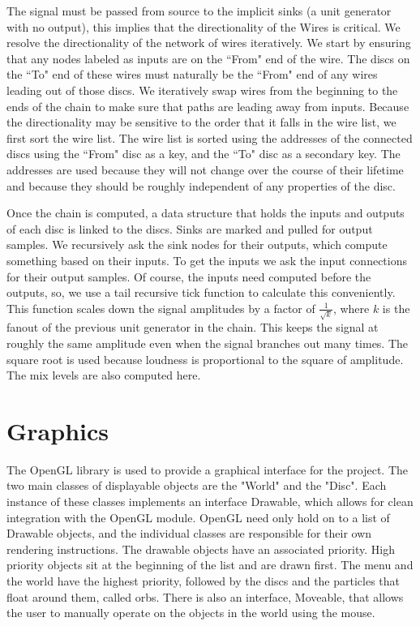 \documentclass[pdftext,twoside,10pt]{article}
\begin{document}
The signal must be passed from source to the implicit sinks (a unit generator with no output), this implies that the directionality of the Wires is critical. We resolve the directionality of the network of wires iteratively. We start by ensuring that any nodes labeled as inputs are on the ``From" end of the wire. The discs on the ``To" end of these wires must naturally be the ``From" end of any wires leading out of those discs. We iteratively swap wires from the beginning to the ends of the chain to make sure that paths are leading away from inputs. Because the directionality may be sensitive to the order that it falls in the wire list, we first sort the wire list. The wire list is sorted using the addresses of the connected discs using the ``From" disc as a key, and the ``To" disc as a secondary key. The addresses are used because they will not change over the course of their lifetime and because they should be roughly independent of any properties of the disc.

Once the chain is computed, a data structure that holds the inputs and outputs of each disc is linked to the discs. Sinks are marked and pulled for output samples. We recursively ask the sink nodes for their outputs, which compute something based on their inputs. To get the inputs we ask the input connections for their output samples. Of course, the inputs need computed before the outputs, so, we use a tail recursive tick function to calculate this conveniently. This function scales down the signal amplitudes by a factor of $\frac{1}{\sqrt{k}}$, where $k$ is the fanout of the previous unit generator in the chain. This keeps the signal at roughly the same amplitude even when the signal branches out many times. The square root is used because loudness is proportional to the square of amplitude. The mix levels are also computed here. 

\vspace{1cm}

\section{Graphics}
The OpenGL library is used to provide a graphical interface for the project. The two main classes of displayable objects are the "World" and the "Disc". Each instance of these classes implements an interface Drawable, which allows for clean integration with the OpenGL module. OpenGL need only hold on to a list of Drawable objects, and the individual classes are responsible for their own rendering instructions. The drawable objects have an associated priority. High priority objects sit at the beginning of the list and are drawn first. The menu and the world have the highest priority, followed by the discs and the particles that float around them, called orbs. There is also an interface, Moveable, that allows the user to manually operate on the objects in the world using the mouse.
\end{document}
